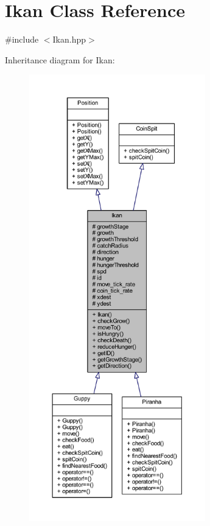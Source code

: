 \hypertarget{class_ikan}{}\section{Ikan Class Reference}
\label{class_ikan}


{\ttfamily \#include $<$Ikan.\+hpp$>$}



Inheritance diagram for Ikan\+:
\nopagebreak
\begin{figure}[H]
\begin{center}
\leavevmode
\includegraphics[height=550pt]{class_ikan__inherit__graph}
\end{center}
\end{figure}



